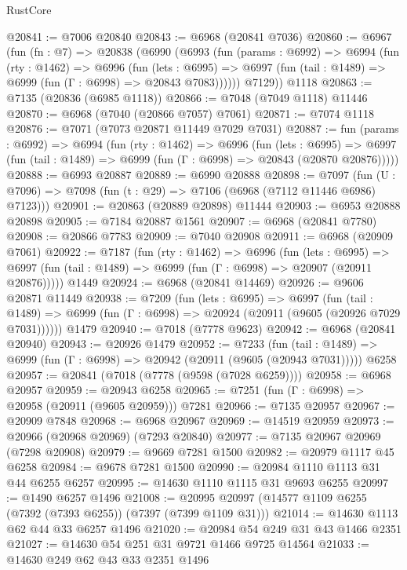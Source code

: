 \begin{lexlean}{RustCore}
\begin{coremodule}
@20841 := @7006 @20840
@20843 := @6968 (@20841 @7036)
@20860 := @6967
    (fun (fn : @7) =>
    @20838
      (@6990
        (@6993
          (fun (params : @6992) =>
          @6994
            (fun (rty : @1462) =>
            @6996
              (fun (lets : @6995) =>
              @6997 (fun (tail : @1489) => @6999 (fun (Γ : @6998) => @20843 @7083))))))
        @7129))
    @1118
@20863 := @7135 (@20836 (@6985 @1118))
@20866 := @7048 (@7049 @1118) @11446
@20870 := @6968 (@7040 (@20866 @7057) @7061)
@20871 := @7074 @1118
@20876 := @7071 (@7073 @20871 @11449 @7029 @7031)
@20887 := fun (params : @6992) =>
  @6994
    (fun (rty : @1462) =>
    @6996
      (fun (lets : @6995) =>
      @6997 (fun (tail : @1489) => @6999 (fun (Γ : @6998) => @20843 (@20870 @20876)))))
@20888 := @6993 @20887
@20889 := @6990 @20888
@20898 := @7097
    (fun (U : @7096) => @7098 (fun (t : @29) => @7106 (@6968 (@7112 @11446 @6986) @7123)))
@20901 := @20863 (@20889 @20898) @11444
@20903 := @6953 @20888 @20898
@20905 := @7184 @20887 @1561
@20907 := @6968 (@20841 @7780)
@20908 := @20866 @7783
@20909 := @7040 @20908
@20911 := @6968 (@20909 @7061)
@20922 := @7187
    (fun (rty : @1462) =>
    @6996
      (fun (lets : @6995) =>
      @6997 (fun (tail : @1489) => @6999 (fun (Γ : @6998) => @20907 (@20911 @20876)))))
    @1449
@20924 := @6968 (@20841 @14469)
@20926 := @9606 @20871 @11449
@20938 := @7209
    (fun (lets : @6995) =>
    @6997
      (fun (tail : @1489) =>
      @6999 (fun (Γ : @6998) => @20924 (@20911 (@9605 (@20926 @7029 @7031))))))
    @1479
@20940 := @7018 (@7778 @9623)
@20942 := @6968 (@20841 @20940)
@20943 := @20926 @1479
@20952 := @7233
    (fun (tail : @1489) => @6999 (fun (Γ : @6998) => @20942 (@20911 (@9605 (@20943 @7031)))))
    @6258
@20957 := @20841 (@7018 (@7778 (@9598 (@7028 @6259))))
@20958 := @6968 @20957
@20959 := @20943 @6258
@20965 := @7251 (fun (Γ : @6998) => @20958 (@20911 (@9605 @20959))) @7281
@20966 := @7135 @20957
@20967 := @20909 @7848
@20968 := @6968 @20967
@20969 := @14519 @20959
@20973 := @20966 (@20968 @20969) (@7293 @20840)
@20977 := @7135 @20967 @20969 (@7298 @20908)
@20979 := @9669 @7281 @1500
@20982 := @20979 @1117 @45 @6258
@20984 := @9678 @7281 @1500
@20990 := @20984 @1110 @1113 @31 @44 @6255 @6257
@20995 := @14630 @1110 @1115 @31 @9693 @6255
@20997 := @1490 @6257 @1496
@21008 := @20995 @20997 (@14577 @1109 @6255 (@7392 (@7393 @6255)) (@7397 (@7399 @1109 @31)))
@21014 := @14630 @1113 @62 @44 @33 @6257 @1496
@21020 := @20984 @54 @249 @31 @43 @1466 @2351
@21027 := @14630 @54 @251 @31 @9721 @1466 @9725 @14564
@21033 := @14630 @249 @62 @43 @33 @2351 @1496

\end{coremodule}
\end{lexlean}

